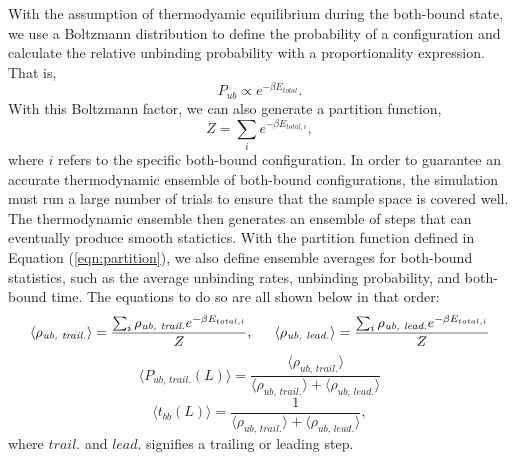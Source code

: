With the assumption of thermodyamic equilibrium during the both-bound state, we use a Boltzmann distribution to define the probability of a configuration and calculate the relative unbinding probability with a proportionality expression. That is, 
\begin{equation}
	P_{ub}\propto e^{-\beta E_{total}}.
\end{equation}
With this Boltzmann factor, we can also generate a partition function, 
\begin{equation} \label{eqn:partition}
	Z=\sum_{i}e^{-\beta E_{total,i}},
\end{equation}
where $i$ refers to the specific both-bound configuration. In order to guarantee an accurate thermodynamic ensemble of both-bound configurations, the simulation must run a large number of trials to ensure that the sample space is covered well. The thermodynamic ensemble then generates an ensemble of steps that can eventually produce smooth statictics. With the partition function defined in Equation (\ref{eqn:partition}), we also define ensemble averages for both-bound statistics, such as the average unbinding rates, unbinding probability, and both-bound time. The equations to do so are all shown below in that order:
\begin{equation}
	\langle\rho_{\textit{ub, trail.}}\rangle=\frac{\sum_{i}\rho_{\textit{ub, trail.}} e^{-\beta E_{total,i}}}{Z}, \indent \langle\rho_{\textit{ub, lead.}}\rangle=\frac{\sum_{i}\rho_{\textit{ub, lead.}} e^{-\beta E_{total,i}}}{Z}
\end{equation}
\begin{equation} \label{eqn:ProbTrail}
	\langle P_{\textit{ub, trail.}}(L)\rangle = \frac{\langle\rho_{\textit{ub, trail.}}\rangle}{\langle\rho_{\textit{ub, trail.}}\rangle + \langle\rho_{\textit{ub, lead.}}\rangle}
\end{equation}
\begin{equation}
	\langle t_{bb}(L) \rangle =\frac{1}{\langle\rho_{\textit{ub, trail.}}\rangle + \langle\rho_{\textit{ub, lead.}}\rangle},
\end{equation}
where $trail.$ and $lead.$ signifies a trailing or leading step.




